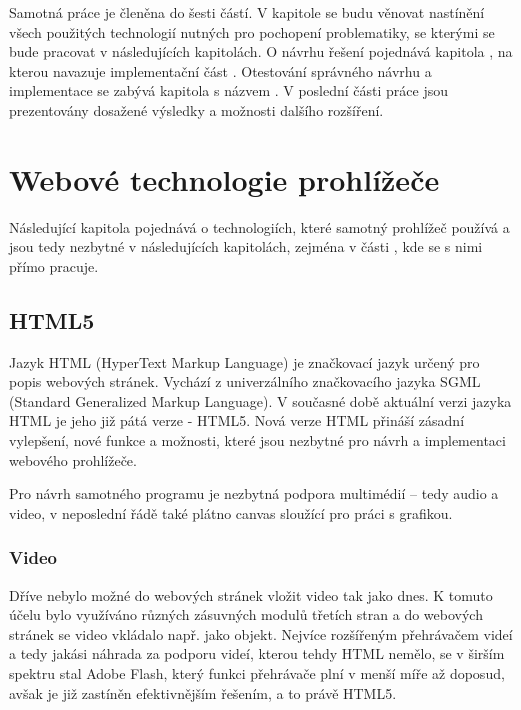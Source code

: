 Samotná práce je členěna do šesti částí. V kapitole  se budu věnovat nastínění všech použitých technologií nutných pro pochopení problematiky, se kterými se bude pracovat v následujících kapitolách. O návrhu řešení pojednává kapitola , na kterou navazuje implementační část . Otestování správného návrhu a implementace se zabývá kapitola s názvem . V poslední části práce  jsou prezentovány dosažené výsledky a možnosti dalšího rozšíření.



\chapter{Webové technologie prohlížeče}
\label{chapter:2}
Následující kapitola pojednává o technologiích, které samotný prohlížeč používá a jsou tedy nezbytné v následujících kapitolách, zejména v části , kde se s nimi přímo pracuje.


\section{HTML5}

Jazyk HTML (HyperText Markup Language) je značkovací jazyk určený pro popis webových stránek. Vychází z univerzálního značkovacího jazyka SGML (Standard Generalized Markup Language). V současné době aktuální verzi  jazyka HTML je jeho již pátá verze -  HTML5. Nová verze HTML přináší zásadní vylepšení, nové funkce a možnosti, které jsou nezbytné pro návrh a implementaci webového prohlížeče. 

Pro návrh samotného programu je nezbytná podpora multimédií – tedy audio a video, v neposlední řádě také plátno canvas sloužící pro práci s grafikou.



\subsection{Video}
Dříve nebylo možné do webových stránek vložit video tak jako dnes. K tomuto účelu bylo využíváno různých zásuvných modulů třetích stran a do webových stránek se video vkládalo např. jako objekt. Nejvíce rozšířeným přehrávačem videí a tedy jakási náhrada za podporu videí, kterou tehdy HTML nemělo, se v širším spektru stal Adobe Flash, který funkci přehrávače plní v menší míře až doposud, avšak je již zastíněn efektivnějším řešením, a to právě HTML5.

